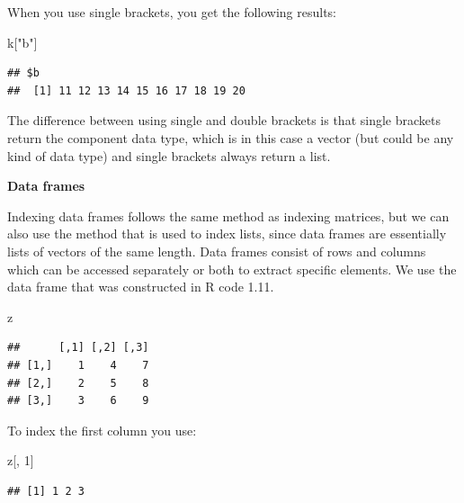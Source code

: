 \documentclass[]{book}
\newenvironment{Shaded}{\begin{snugshade}}{\end{snugshade}}
\newcommand{\DecValTok}[1]{\textcolor[rgb]{0.00,0.00,0.81}{#1}}
\newcommand{\StringTok}[1]{\textcolor[rgb]{0.31,0.60,0.02}{#1}}
\newcommand{\OperatorTok}[1]{\textcolor[rgb]{0.81,0.36,0.00}{\textbf{#1}}}
\newcommand{\NormalTok}[1]{#1}
\begin{document}
When you use single brackets, you get the following results:

\begin{Shaded}
\begin{Highlighting}[]
\NormalTok{k[}\StringTok{"b"}\NormalTok{]}
\end{Highlighting}
\end{Shaded}

\begin{verbatim}
## $b
##  [1] 11 12 13 14 15 16 17 18 19 20
\end{verbatim}

The difference between using single and double brackets is that single
brackets return the component data type, which is in this case a vector
(but could be any kind of data type) and single brackets always return a
list.

\textbf{Data frames}

Indexing data frames follows the same method as indexing matrices, but
we can also use the method that is used to index lists, since data
frames are essentially lists of vectors of the same length. Data frames
consist of rows and columns which can be accessed separately or both to
extract specific elements. We use the data frame that was constructed in
R code 1.11.

\begin{Shaded}
\begin{Highlighting}[]
\NormalTok{z}
\end{Highlighting}
\end{Shaded}

\begin{verbatim}
##      [,1] [,2] [,3]
## [1,]    1    4    7
## [2,]    2    5    8
## [3,]    3    6    9
\end{verbatim}

To index the first column you use:

\begin{Shaded}
\begin{Highlighting}[]
\NormalTok{z[, }\DecValTok{1}\NormalTok{]}
\end{Highlighting}
\end{Shaded}

\begin{verbatim}
## [1] 1 2 3
\end{verbatim}

\begin{Shaded}
\end{Shaded}
\end{document}

